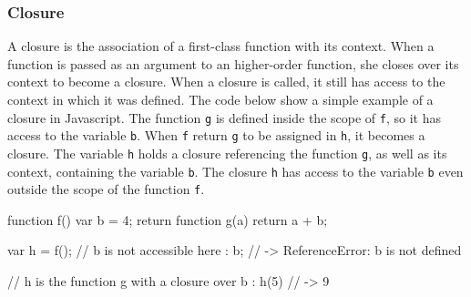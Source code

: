 \subsubsection{Closure}


A closure is the association of a first-class function with its context.
When a function is passed as an argument to an higher-order function, she closes over its context to become a closure.
When a closure is called, it still has access to the context in which it was defined.
The code below show a simple example of a closure in Javascript.
The function \texttt{g} is defined inside the scope of \texttt{f}, so it has access to the variable \texttt{b}.
When \texttt{f} return \texttt{g} to be assigned in \texttt{h}, it becomes a closure.
The variable \texttt{h} holds a closure referencing the function \texttt{g}, as well as its context, containing the variable \texttt{b}.
The closure \texttt{h} has access to the variable \texttt{b} even outside the scope of the function \texttt{f}.

\begin{code}
  function f() {
    var b = 4;
    return function g(a) {
      return a + b;
    }
  }

  var h = f();
  // b is not accessible here :
  b; // -> ReferenceError: b is not defined

  // h is the function g with a closure over b :
  h(5) // -> 9
\end{code}




